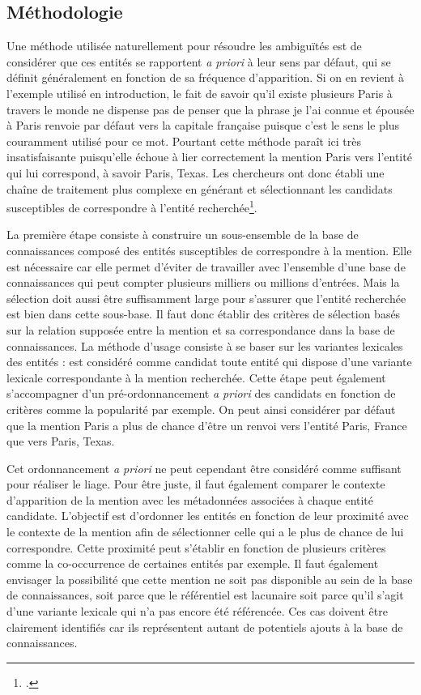 \documentclass[a4paper,12pt,twoside]{book}
\begin{document}
	\subsection{Méthodologie}
	
	Une méthode utilisée naturellement pour résoudre les ambiguïtés est de considérer que ces entités se rapportent \textit{a priori} à leur sens par défaut, qui se définit généralement en fonction de sa fréquence d'apparition. Si on en revient à l'exemple utilisé en introduction, le fait de savoir qu'il existe plusieurs \og Paris\fg{} à travers le monde ne dispense pas de penser que la phrase \og je l’ai connue et épousée à Paris\fg{} renvoie par défaut vers la capitale française puisque c'est le sens le plus couramment utilisé pour ce mot. Pourtant cette méthode paraît ici très insatisfaisante puisqu'elle échoue à lier correctement la mention \og Paris\fg{} vers l'entité qui lui correspond, à savoir \og Paris, Texas\fg{}. Les chercheurs ont donc établi une chaîne de traitement plus complexe en générant et sélectionnant les candidats susceptibles de correspondre à l'entité recherchée\footcite[p. 117--125]{stern_identification_2013}.
	
	La première étape consiste à construire un sous-ensemble de la base de connaissances composé des entités susceptibles de correspondre à la mention. Elle est nécessaire car elle permet d'éviter de travailler avec l'ensemble d'une base de connaissances qui peut compter plusieurs milliers ou millions d'entrées. Mais la sélection doit aussi être suffisamment large pour s'assurer que l'entité recherchée est bien dans cette sous-base. Il faut donc établir des critères de sélection basés sur la relation supposée entre la mention et sa correspondance dans la base de connaissances. La méthode d'usage consiste à se baser sur les variantes lexicales des entités : est considéré comme candidat toute entité qui dispose d'une variante lexicale correspondante à la mention recherchée. Cette étape peut également s'accompagner d'un pré-ordonnancement \textit{a priori} des candidats en fonction de critères comme la popularité par exemple. On peut ainsi considérer par défaut que la mention \og Paris\fg{} a plus de chance d'être un renvoi vers l'entité \og Paris, France\fg{} que vers \og Paris, Texas\fg{}.
	
	Cet ordonnancement \textit{a priori} ne peut cependant être considéré comme suffisant pour réaliser le liage. Pour être juste, il faut également comparer le contexte d'apparition de la mention avec les métadonnées associées à chaque entité candidate. L'objectif est d'ordonner les entités en fonction de leur proximité avec le contexte de la mention afin de sélectionner celle qui a le plus de chance de lui correspondre. Cette proximité peut s'établir en fonction de plusieurs critères comme la co-occurrence de certaines entités par exemple. Il faut également envisager la possibilité que cette mention ne soit pas disponible au sein de la base de connaissances, soit parce que le référentiel est lacunaire soit parce qu'il s'agit d'une variante lexicale qui n'a pas encore été référencée. Ces cas doivent être clairement identifiés car ils représentent autant de potentiels ajouts à la base de connaissances.
	
\end{document}
